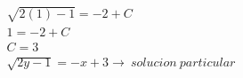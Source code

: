 \documentclass{article}
\begin{document}
\begin{eqnarray}
\nonumber \sqrt{2(1)-1} = -2 + C \\
\nonumber 1 = -2 + C \\
\nonumber C = 3 \\
\nonumber \sqrt{2y-1} = -x + 3 \rightarrow \ solucion \ particular
\end{eqnarray}
\end{document}
